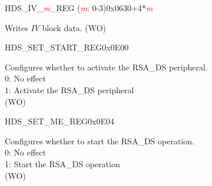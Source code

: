 


\begin{register}{H}{DS\_IV\_\textcolor{red}{\it{m}}\_REG (\textcolor{red}{\it{m}}: 0-3)}{0x0630+4*\textcolor{red}{\it{m}}}\label{regdesc:DSIVREG}
%
\regnewline%
\begin{regdesc}\begin{reglist}
\item [DS\_IV\_\textcolor{red}{\it{m}}\_REG (\textcolor{red}{\it{m}}: 0-3)] Writes \begin{math}IV\end{math} block data. (WO)
\end{reglist}\end{regdesc}
\end{register}


\begin{register}{H}{DS\_SET\_START\_REG}{0x0E00}\label{regdesc:DSSETSTARTREG}
%
%
\regnewline%
\begin{regdesc}\begin{reglist}
\item [DS\_SET\_START] Configures whether to activate the RSA\_DS peripheral.\\
0: No effect\\
1: Activate the RSA\_DS peripheral\\
(WO)
\end{reglist}\end{regdesc}
\end{register}


\begin{register}{H}{DS\_SET\_ME\_REG}{0x0E04}\label{regdesc:DSSETMEREG}
%
%
\regnewline%
\begin{regdesc}\begin{reglist}
\item [DS\_SET\_ME] Configures whether to start the RSA\_DS operation. \\
0: No effect\\
1: Start the RSA\_DS operation\\
(WO)
\end{reglist}\end{regdesc}
\end{register}


